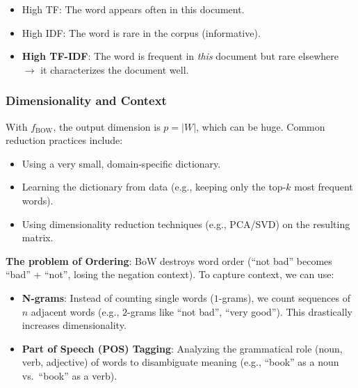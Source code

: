 \begin{tipsblock}[Intuition]
    \begin{itemize}
        \item High TF: The word appears often in this document.
        \item High IDF: The word is rare in the corpus (informative).
        \item \textbf{High TF-IDF}: The word is frequent in \textit{this} document but rare elsewhere $\to$ it characterizes the document well.
    \end{itemize}
\end{tipsblock}

\subsubsection{Dimensionality and Context}

With $f_{\text{BOW}}$, the output dimension is $p = |W|$, which can be huge. Common reduction practices include:
\begin{itemize}
    \item Using a very small, domain-specific dictionary.
    \item Learning the dictionary from data (e.g., keeping only the top-$k$ most frequent words).
    \item Using dimensionality reduction techniques (e.g., PCA/SVD) on the resulting matrix.
\end{itemize}

\textbf{The problem of Ordering}:
BoW destroys word order (``not bad'' becomes ``bad'' + ``not'', losing the negation context). To capture context, we can use:
\begin{itemize}
    \item \textbf{N-grams}: Instead of counting single words ($1$-grams), we count sequences of $n$ adjacent words (e.g., $2$-grams like ``not bad'', ``very good''). This drastically increases dimensionality.
    \item \textbf{Part of Speech (POS) Tagging}: Analyzing the grammatical role (noun, verb, adjective) of words to disambiguate meaning (e.g., ``book'' as a noun vs.\ ``book'' as a verb).
\end{itemize}
